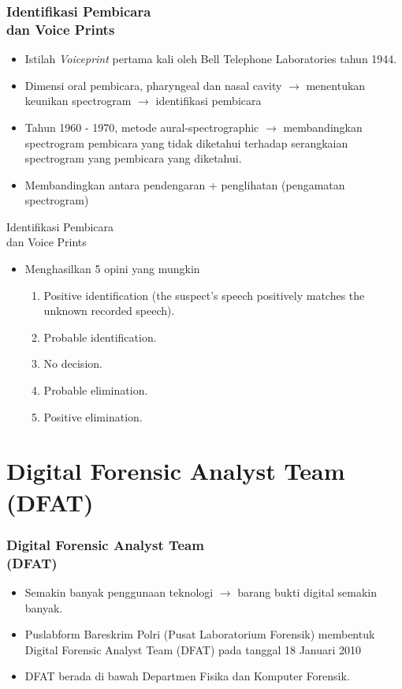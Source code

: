 \documentclass[pdflatex,compress]{beamer}
\begin{document}
\begin{frame}
	\frametitle{Identifikasi Pembicara \\dan Voice Prints}
	\begin{itemize}
		\item Istilah \textit{Voiceprint} pertama kali oleh Bell Telephone Laboratories tahun 1944.
		\item Dimensi oral pembicara, pharyngeal dan nasal cavity $\rightarrow$ menentukan keunikan spectrogram $\rightarrow$ identifikasi pembicara
		\item Tahun 1960 - 1970, metode aural-spectrographic $\rightarrow$ membandingkan spectrogram pembicara yang tidak diketahui terhadap serangkaian spectrogram yang pembicara yang diketahui.
		\item Membandingkan antara pendengaran + penglihatan (pengamatan spectrogram)
	\end{itemize}
\end{frame}

\begin{frame}{Identifikasi Pembicara \\dan Voice Prints}
	\begin{itemize}
		\item Menghasilkan 5 opini yang mungkin
		\begin{enumerate}
			\item Positive identification (the suspect’s speech positively matches the unknown
			recorded speech).
			\item Probable identification.
			\item No decision.
			\item Probable elimination.
			\item Positive elimination.
		\end{enumerate}
	\end{itemize}
\end{frame}

\section{Digital Forensic Analyst Team (DFAT)}

\begin{frame}
	\frametitle{Digital Forensic Analyst Team\\(DFAT)}
	\begin{itemize}
		\item Semakin banyak penggunaan teknologi $\rightarrow$ barang bukti digital semakin banyak.
		\item Puslabform Bareskrim Polri (Pusat Laboratorium Forensik) membentuk Digital Forensic Analyst Team (DFAT) pada tanggal 18 Januari 2010
		\item DFAT berada di bawah Departmen Fisika dan Komputer Forensik.
	\end{itemize}
\end{frame}
\end{document}

